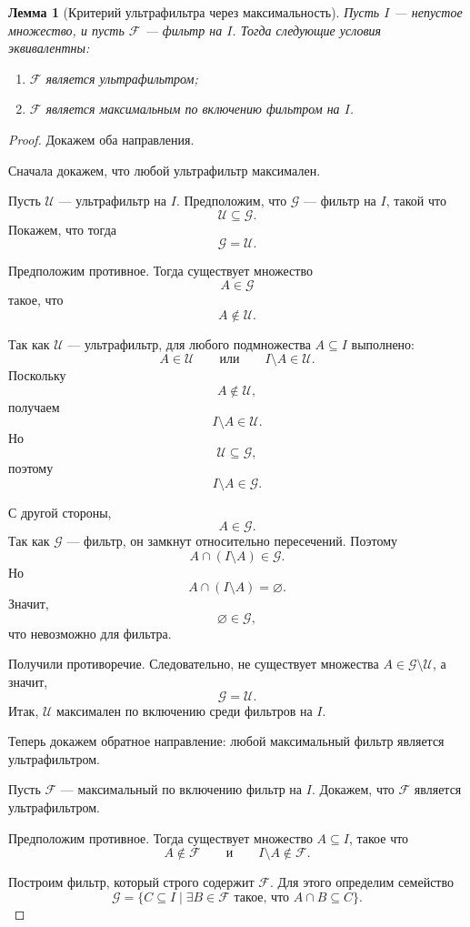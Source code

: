 \documentclass[12pt,a4paper,oneside,openany]{book}
\theoremstyle{definition}
\theoremstyle{plain}
\newtheorem{lemma}{Лемма}[chapter]
\theoremstyle{remark}
\begin{document}
\begin{lemma}[Критерий ультрафильтра через максимальность]
Пусть $I$ — непустое множество, и пусть $\mathcal F$ — фильтр на $I$. Тогда следующие условия эквивалентны:
\begin{enumerate}
    \item $\mathcal F$ является ультрафильтром;
    \item $\mathcal F$ является максимальным по включению фильтром на $I$.
\end{enumerate}
\end{lemma}

\begin{proof}
Докажем оба направления.

Сначала докажем, что любой ультрафильтр максимален.

Пусть $\mathcal U$ — ультрафильтр на $I$. Предположим, что $\mathcal G$ — фильтр на $I$, такой что
\[
\mathcal U\subseteq \mathcal G.
\]
Покажем, что тогда
\[
\mathcal G=\mathcal U.
\]

Предположим противное. Тогда существует множество
\[
A\in\mathcal G
\]
такое, что
\[
A\notin\mathcal U.
\]

Так как $\mathcal U$ — ультрафильтр, для любого подмножества $A\subseteq I$ выполнено:
\[
A\in\mathcal U
\qquad
\text{или}
\qquad
I\setminus A\in\mathcal U.
\]
Поскольку
\[
A\notin\mathcal U,
\]
получаем
\[
I\setminus A\in\mathcal U.
\]
Но
\[
\mathcal U\subseteq\mathcal G,
\]
поэтому
\[
I\setminus A\in\mathcal G.
\]

С другой стороны,
\[
A\in\mathcal G.
\]
Так как $\mathcal G$ — фильтр, он замкнут относительно пересечений. Поэтому
\[
A\cap(I\setminus A)\in\mathcal G.
\]
Но
\[
A\cap(I\setminus A)=\varnothing.
\]
Значит,
\[
\varnothing\in\mathcal G,
\]
что невозможно для фильтра.

Получили противоречие. Следовательно, не существует множества $A\in\mathcal G\setminus\mathcal U$, а значит,
\[
\mathcal G=\mathcal U.
\]
Итак, $\mathcal U$ максимален по включению среди фильтров на $I$.

Теперь докажем обратное направление: любой максимальный фильтр является ультрафильтром.

Пусть $\mathcal F$ — максимальный по включению фильтр на $I$. Докажем, что $\mathcal F$ является ультрафильтром.

Предположим противное. Тогда существует множество $A\subseteq I$, такое что
\[
A\notin\mathcal F
\qquad
\text{и}
\qquad
I\setminus A\notin\mathcal F.
\]

Построим фильтр, который строго содержит $\mathcal F$. Для этого определим семейство
\[
\mathcal G
=
\{C\subseteq I\mid \exists B\in\mathcal F\text{ такое, что } A\cap B\subseteq C\}.
\]


\end{proof}
\end{document}
